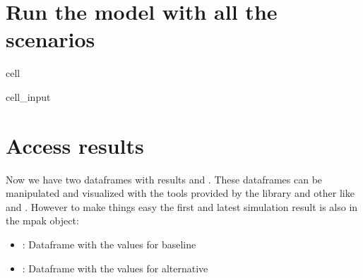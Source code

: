 \documentclass[letterpaper,10pt,english]{jupyterBook}
\begin{document}
\section{Run the model with all the scenarios}
\label{\detokenize{content/howto/experiments/create_experiment:run-the-model-with-all-the-scenarios}}
\begin{sphinxuseclass}{cell}\begin{sphinxVerbatimInput}

\begin{sphinxuseclass}{cell_input}
\begin{sphinxVerbatim}[commandchars=\\\{\}]
   
\end{sphinxVerbatim}

\end{sphinxuseclass}\end{sphinxVerbatimInput}

\end{sphinxuseclass}

\section{Access results}
\label{\detokenize{content/howto/experiments/create_experiment:access-results}}
\sphinxAtStartPar
Now we have two dataframes with results  and . These dataframes can be manipulated and visualized
with the tools provided by the  library and other like  and . However to make things easy the first and
latest simulation result is also in the mpak object:
\begin{itemize}
\item {} 
\sphinxAtStartPar
{}: Dataframe with the values for baseline

\item {} 
\sphinxAtStartPar
{}: Dataframe with the values for alternative

\end{itemize}
\end{document}
